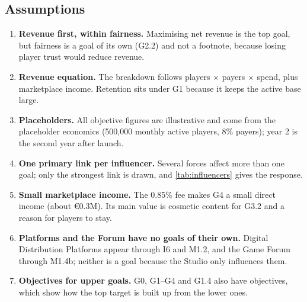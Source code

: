 \subsection*{Assumptions}
\begin{enumerate}
  \item \textbf{Revenue first, within fairness.} Maximising net revenue is the top goal, but fairness is a goal of its own
  (G2.2) and not a footnote, because losing player trust would reduce revenue.
  \item \textbf{Revenue equation.} The breakdown follows players $\times$ payers $\times$ spend, plus marketplace income.
  Retention sits under G1 because it keeps the active base large.
  \item \textbf{Placeholders.} All objective figures are illustrative and come from the placeholder economics (500,000 monthly
  active players, 8\% payers); year 2 is the second year after launch.
  \item \textbf{One primary link per influencer.} Several forces affect more than one goal; only the strongest link is drawn,
  and \autoref{tab:influencers} gives the response.
  \item \textbf{Small marketplace income.} The 0.85\% fee makes G4 a small direct income (about €0.3M). Its main value is
  cosmetic content for G3.2 and a reason for players to stay.
  \item \textbf{Platforms and the Forum have no goals of their own.} Digital Distribution Platforms appear through I6 and M1.2,
  and the Game Forum through M1.4b; neither is a goal because the Studio only influences them.
  \item \textbf{Objectives for upper goals.} G0, G1--G4 and G1.4 also have objectives, which show how the top target is built up
  from the lower ones.
\end{enumerate}
